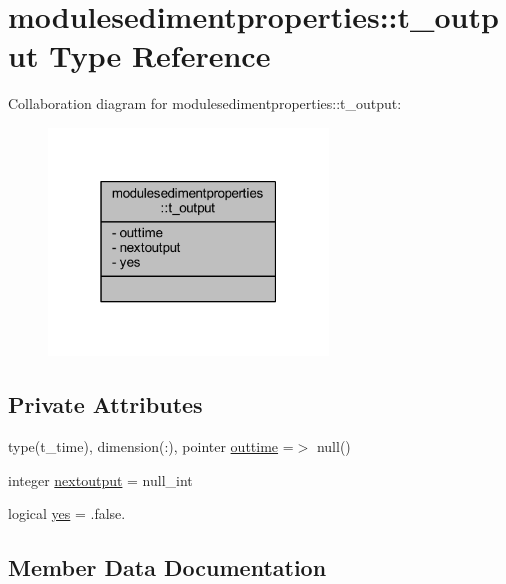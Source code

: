 \hypertarget{structmodulesedimentproperties_1_1t__output}{}\section{modulesedimentproperties\+:\+:t\+\_\+output Type Reference}
\label{structmodulesedimentproperties_1_1t__output}


Collaboration diagram for modulesedimentproperties\+:\+:t\+\_\+output\+:\nopagebreak
\begin{figure}[H]
\begin{center}
\leavevmode
\includegraphics[width=211pt]{structmodulesedimentproperties_1_1t__output__coll__graph}
\end{center}
\end{figure}
\subsection*{Private Attributes}
\begin{DoxyCompactItemize}
\item 
type(t\+\_\+time), dimension(\+:), pointer \mbox{\hyperlink{structmodulesedimentproperties_1_1t__output_afa2919505bebc1aaf247332d86a196b7}{outtime}} =$>$ null()
\item 
integer \mbox{\hyperlink{structmodulesedimentproperties_1_1t__output_acd11095f7d9d4f44262cb794e4e6b424}{nextoutput}} = null\+\_\+int
\item 
logical \mbox{\hyperlink{structmodulesedimentproperties_1_1t__output_a43181389dc0e9cde686799cb9f9ac136}{yes}} = .false.
\end{DoxyCompactItemize}


\subsection{Member Data Documentation}
\mbox{\label{structmodulesedimentproperties_1_1t__output_acd11095f7d9d4f44262cb794e4e6b424}} 
